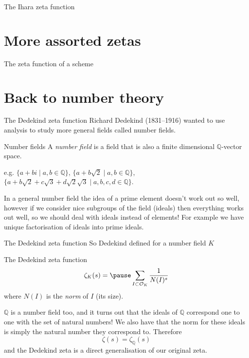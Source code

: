\documentclass{beamer}
\begin{document}
\begin{frame}{The Ihara zeta function}
\begin{block}{}
\end{block}
\end{frame}

\section[More zetas]{More assorted zetas}

\begin{frame}{The zeta function of a scheme}
\begin{block}{}
\end{block}
\end{frame}

\section[Number theory again]{Back to number theory}
\begin{frame}{The Dedekind zeta function}
Richard Dedekind (1831--1916) wanted to use analysis to study more general fields called number fields.

\pause \begin{block}{Number fields}
A \emph{number field} is a field that is also a finite dimensional $\mathbb{Q}$-vector space.
\end{block}

\pause e.g. $\{a+bi\mid a,b\in\mathbb{Q}\}$, \pause $\{a+b\sqrt{2}\mid a,b\in\mathbb{Q}\}$, \pause $\{a+b\sqrt{2} +c\sqrt{3}+d\sqrt{2}\sqrt{3}\mid a,b,c,d\in\mathbb{Q}\}$.

\pause In a general number field the idea of a prime element doesn't work out so well, however if we consider nice subgroups of the field (ideals) then everything works out well, so we should deal with ideals instead of elements!
\pause For example we  have unique factorisation of ideals into prime ideals.
\end{frame}

\begin{frame}{The Dedekind zeta function}
So Dedekind defined for a number field $K$
\begin{block}{The Dedekind zeta function}
\[\zeta_K(s) = \pause \sum_{I\subset \mathcal{O}_K} \frac{1}{N(I)^s}\]
where $N(I)$ is the \emph{norm} of $I$ (its size).
\end{block}
\pause $\mathbb{Q}$ is a number field too, and it turns out that the ideals of $\mathbb{Q}$ correspond one to one with the set of natural numbers!
We also have that the norm for these ideals is simply the natural number they correspond to.
\pause Therefore
\[\zeta(s) = \zeta_\mathbb{Q}(s)\]
and the Dedekind zeta is a direct generalisation of our original zeta.
\end{frame}
\end{document}
